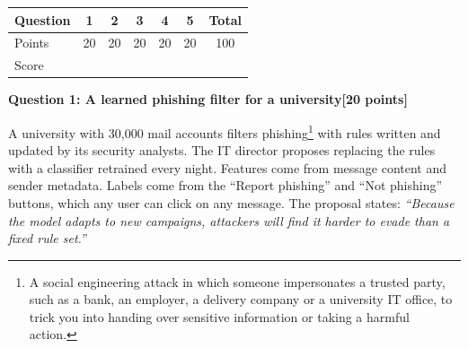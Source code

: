 \documentclass[10pt,a4paper]{extarticle}
\newcommand{\question}[3]{%
  \bigskip
  \begin{tcolorbox}[colback=navy!6, colframe=navy, boxrule=0.6pt, arc=1pt,
                    left=5pt, right=5pt, top=2pt, bottom=2pt]
    \textbf{\color{navy}Question #1: #2}\hfill\textbf{\color{accent}[#3 points]}
  \end{tcolorbox}\nopagebreak[4]}
\begin{document}
\begin{center}
\renewcommand{\arraystretch}{1.25}
\begin{tabular}{@{}lccccc|c@{}}
\toprule
Question & 1 & 2 & 3 & 4 & 5 & Total\\
\midrule
Points & 20 & 20 & 20 & 20 & 20 & 100\\
Score & & & & & & \\
\bottomrule
\end{tabular}
\end{center}

\question{1}{A learned phishing filter for a university}{20}

A university with 30{,}000 mail accounts filters phishing\footnote{A social engineering attack in which someone impersonates a trusted party, such as a bank, an employer, a delivery company or a university IT office, to trick you into handing over sensitive information or taking a harmful action.} with rules written and updated by its security analysts. The IT director proposes replacing the rules with a classifier retrained every night. Features come from message content and sender metadata. Labels come from the ``Report phishing'' and ``Not phishing'' buttons, which any user can click on any message. The proposal states: \emph{``Because the model adapts to new campaigns, attackers will find it harder to evade than a fixed rule set.''}
\end{document}
